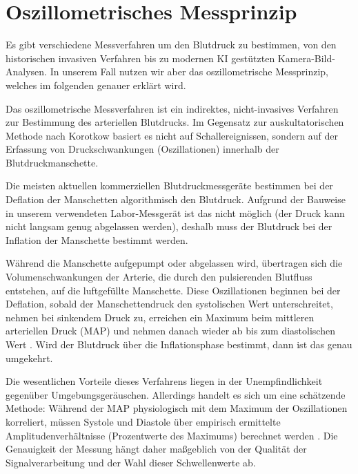 \documentclass[a4paper, 11pt]{scrartcl}
\begin{document}
\newpage
\section{Oszillometrisches Messprinzip}

Es gibt verschiedene Messverfahren um den Blutdruck zu bestimmen, von den historischen invasiven Verfahren bis zu modernen KI gestützten Kamera-Bild-Analysen. In unserem Fall nutzen wir aber das oszillometrische Messprinzip, welches im folgenden genauer erklärt wird.


Das oszillometrische Messverfahren ist ein indirektes, nicht-invasives Verfahren zur Bestimmung des arteriellen Blutdrucks. Im Gegensatz zur auskultatorischen Methode nach Korotkow \cite{muntner2019measurement} basiert es nicht auf Schallereignissen, sondern auf der Erfassung von Druckschwankungen (Oszillationen) innerhalb der Blutdruckmanschette.

Die meisten aktuellen kommerziellen Blutdruckmessgeräte bestimmen bei der Deflation der Manschetten algorithmisch den Blutdruck. Aufgrund der Bauweise in unserem verwendeten Labor-Messgerät ist das nicht möglich (der Druck kann nicht langsam genug abgelassen werden), deshalb muss der Blutdruck bei der Inflation der Manschette bestimmt werden.

Während die Manschette aufgepumpt oder abgelassen wird, übertragen sich die Volumenschwankungen der Arterie, die durch den pulsierenden Blutfluss entstehen, auf die luftgefüllte Manschette. Diese Oszillationen beginnen bei der Deflation, sobald der Manschettendruck den systolischen Wert unterschreitet, nehmen bei sinkendem Druck zu, erreichen ein Maximum beim mittleren arteriellen Druck (MAP) und nehmen danach wieder ab bis zum diastolischen Wert \cite{Future}. Wird der Blutdruck über die Inflationsphase bestimmt, dann ist das genau umgekehrt.

Die wesentlichen Vorteile dieses Verfahrens liegen in der Unempfindlichkeit gegenüber Umgebungsgeräuschen. Allerdings handelt es sich um eine schätzende Methode: Während der MAP physiologisch mit dem Maximum der Oszillationen korreliert, müssen Systole und Diastole über empirisch ermittelte Amplitudenverhältnisse (Prozentwerte des Maximums) berechnet werden \cite{Automated}. Die Genauigkeit der Messung hängt daher maßgeblich von der Qualität der Signalverarbeitung und der Wahl dieser Schwellenwerte ab.

\newpage
\end{document}
